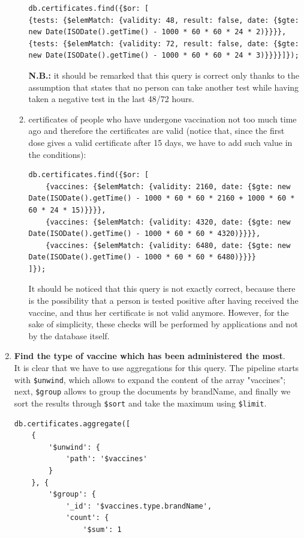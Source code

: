 \documentclass{article}
\begin{document}
\begin{enumerate}
\begin{enumerate}
    \begin{lstlisting}
db.certificates.find({$or: [
{tests: {$elemMatch: {validity: 48, result: false, date: {$gte: new Date(ISODate().getTime() - 1000 * 60 * 60 * 24 * 2)}}}}, 
{tests: {$elemMatch: {validity: 72, result: false, date: {$gte: new Date(ISODate().getTime() - 1000 * 60 * 60 * 24 * 3)}}}}]});
    \end{lstlisting}
    \textbf{N.B.:} it should be remarked that this query is correct only thanks to the assumption that states that no person can take another test while having taken a negative test in the last 48/72 hours.
    \item certificates of people who have undergone vaccination not too much time ago and therefore the certificates are valid (notice that, since the first dose gives a valid certificate after 15 days, we have to add such value in the conditions):
    \begin{lstlisting}
db.certificates.find({$or: [
    {vaccines: {$elemMatch: {validity: 2160, date: {$gte: new Date(ISODate().getTime() - 1000 * 60 * 60 * 2160 + 1000 * 60 * 60 * 24 * 15)}}}},
    {vaccines: {$elemMatch: {validity: 4320, date: {$gte: new Date(ISODate().getTime() - 1000 * 60 * 60 * 4320)}}}},
    {vaccines: {$elemMatch: {validity: 6480, date: {$gte: new Date(ISODate().getTime() - 1000 * 60 * 60 * 6480)}}}}
]});
    \end{lstlisting}
    It should be noticed that this query is not exactly correct, because there is the possibility that a person is tested positive after having received the vaccine, and thus her certificate is not valid anymore. However, for the sake of simplicity, these checks will be performed by applications and not by the database itself.
    \end{enumerate}
    \item \textbf{Find the type of vaccine which has been administered the most}.\\
    It is clear that we have to use aggregations for this query. The pipeline starts with \verb|$unwind|, which allows to expand the content of the array "vaccines"; next, \verb|$group| allows to group the documents by brandName, and finally we sort the results through \verb|$sort| and take the maximum using \verb|$limit|. 
    \begin{lstlisting}
db.certificates.aggregate([
    {
        '$unwind': {
            'path': '$vaccines'
        }
    }, {
        '$group': {
            '_id': '$vaccines.type.brandName', 
            'count': {
                '$sum': 1

\end{lstlisting}
\end{enumerate}
\end{document}
